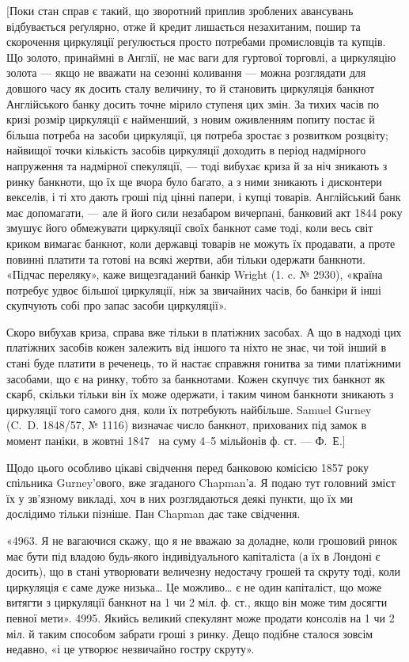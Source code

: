 
[Поки стан справ є такий, що зворотний приплив зроблених авансувань
відбувається реґулярно, отже й кредит лишається незахитаним, пошир та
скорочення циркуляції реґулюється просто потребами промисловців та купців. Що
золото, принаймні в Англії, не має ваги для гуртової торговлі, а циркуляцію
золота — якщо не вважати на сезонні коливання — можна розглядати для довшого
часу як досить сталу величину, то й становить циркуляція банкнот Англійського
банку досить точне мірило ступеня цих змін. За тихих часів по кризі розмір
циркуляції є найменший, з новим оживленням попиту постає й більша потреба
на засоби циркуляції, ця потреба зростає з розвитком розцвіту; найвищої точки
кількість засобів циркуляції доходить в період надмірного напруження та надмірної
спекуляції, — тоді вибухає криза й за ніч зникають з ринку банкноти,
що їх ще вчора було багато, а з ними зникають і дисконтери векселів, і ті хто
дають гроші під цінні папери, і купці товарів. Англійський банк має допомагати,
— але й його сили незабаром вичерпані, банковий акт 1844 року змушує
його обмежувати циркуляції своїх банкнот саме тоді, коли весь світ криком
вимагає банкнот, коли державці товарів не можуть їх продавати, а проте повинні
платити та готові на всякі жертви, аби тільки одержати банкноти. «Підчас
переляку», каже вищезгаданий банкір Wright (1. c. № 2930), «країна потребує
удвоє більшої циркуляції, ніж за звичайних часів, бо банкіри й інші скупчують
собі про запас засоби циркуляції».

Скоро вибухав криза, справа вже тільки в платіжних засобах. А що
в надході цих платіжних засобів кожен залежить від іншого та ніхто не знає,
чи той інший в стані буде платити в реченець, то й настає справжня гонитва
за тими платіжними засобами, що є на ринку, тобто за банкнотами. Кожен
скупчує тих банкнот як скарб, скільки тільки він їх може одержати, і таким
чином банкноти зникають з циркуляції того самого дня, коли їх потребують
найбільше. Samuel Gurney (C.~D. 1848/57, № 1116) визначає число банкнот,
прихованих під замок в момент паніки, в жовтні 1847~ на суму 4--5 мільйонів
ф. ст. — Ф.~Е.]

Щодо цього особливо цікаві свідчення перед банковою комісією 1857 року
спільника Gurney’ового, вже згаданого Chapman’а. Я подаю тут головний
зміст їх у зв’язному викладі, хоч в них розглядаються деякі пункти, що їх ми
дослідимо тільки пізніше. Пан Chapman дає таке свідчення.

«4963. Я не вагаючися скажу, що я не вважаю за доладне, коли грошовий
ринок має бути під владою будь-якого індивідуального капіталіста (а їх
в Лондоні є досить), що в стані утворювати величезну недостачу грошей та скруту
тоді, коли циркуляція є саме дуже низька\dots{} Це можливо\dots{} є не один капіталіст,
що може витягти з циркуляції банкнот на 1 чи 2 міл. ф. ст., якщо він
може тим досягти певної мети». 4995. Якийсь великий спекулянт може продати
консолів на 1 чи 2 міл. й таким способом забрати гроші з ринку. Дещо подібне
сталося зовсім недавно, «і це утворює незвичайно гостру скруту».

